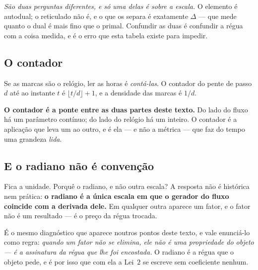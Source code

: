 \documentclass[livro.tex]{subfiles}
\begin{document}
\noindent \emph{São duas perguntas diferentes, e só uma delas é sobre a escala.} O elemento é
autodual; o reticulado não é, e o que os separa é exatamente $\Delta$ --- que mede quanto o dual é
mais fino que o primal. Confundir as duas é confundir a régua com a coisa medida, e é o erro que
esta tabela existe para impedir.

\subsection{O contador}\label{sec:contador}

\noindent Se as marcas são o relógio, ler as horas é \emph{contá-las}. O contador do pente de
passo $d$ até ao instante $t$ é $\lfloor t/d\rfloor + 1$, e a densidade das marcas é $1/d$.


\noindent \textbf{O contador é a ponte entre as duas partes deste texto.} Do lado do fluxo há um
parâmetro contínuo; do lado do relógio há um inteiro. O contador é a aplicação que leva um ao
outro, e é ela --- e não a métrica --- que faz do tempo uma grandeza \emph{lida}.

\subsection{E o radiano não é convenção}\label{sec:radiano}

\noindent Fica a unidade. Porquê o radiano, e não outra escala? A resposta não é histórica nem
prática: \textbf{o radiano é a única escala em que o gerador do fluxo coincide com a derivada
dele.} Em qualquer outra aparece um fator, e o fator não é um resultado --- é o preço da régua
trocada.


\noindent É o mesmo diagnóstico que aparece noutros pontos deste texto, e vale enunciá-lo como
regra: \emph{quando um fator não se elimina, ele não é uma propriedade do objeto --- é a assinatura
da régua que lhe foi encostada.} O radiano é a régua que o objeto pede, e é por isso que com ela a
Lei~$2$ se escreve sem coeficiente nenhum.
\end{document}

